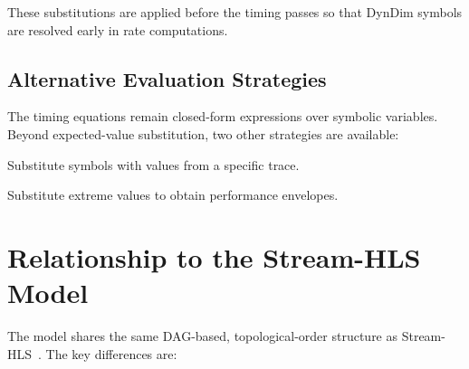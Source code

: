 \documentclass[10pt]{article}
\begin{document}
These substitutions are applied before the timing passes so that DynDim symbols are resolved early in rate computations.

\subsection{Alternative Evaluation Strategies}

The timing equations remain closed-form expressions over symbolic variables. Beyond expected-value substitution, two other strategies are available:
\begin{description}[leftmargin=1.5em, labelindent=0em]
    \item[Concrete instantiation.] Substitute symbols with values from a specific trace.
    \item[Worst/best-case bounds.] Substitute extreme values to obtain performance envelopes.
\end{description}

\section{Relationship to the Stream-HLS Model}

The model shares the same DAG-based, topological-order structure as Stream-HLS~\cite{basalama2025streamhls}. The key differences are:
\end{document}
